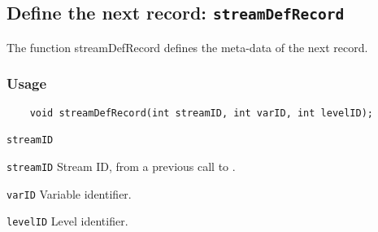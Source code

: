 

\subsection{Define the next record: \texttt{streamDefRecord}}
\label{streamDefRecord}

The function streamDefRecord defines the meta-data of the next record.
\subsubsection*{Usage}

\begin{verbatim}
    void streamDefRecord(int streamID, int varID, int levelID);
\end{verbatim}

\hspace*{4mm}\begin{minipage}[]{15cm}
\begin{deflist}{\texttt{streamID}\ }
\item[\texttt{streamID}]
Stream ID, from a previous call to {}.
\item[\texttt{varID}]
Variable identifier.
\item[\texttt{levelID}]
Level identifier.

\end{deflist}
\end{minipage}
